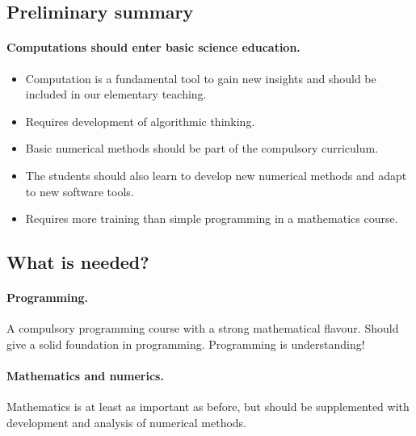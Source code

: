 \documentclass[%
twoside,                 %
final,                   %
10pt]{article}
\begin{document}
\noindent




\subsection{Preliminary summary}

\paragraph{Computations should enter basic science education.}

\begin{itemize}
\item Computation is a fundamental tool to gain new insights and should be included in our elementary teaching.

\item Requires development of algorithmic thinking.

\item Basic numerical methods should be part of the compulsory curriculum.

\item The students should also learn to develop new numerical methods and adapt to new software tools.

\item Requires more training than simple programming in a mathematics course.
\end{itemize}

\noindent




\subsection{What is needed?}

\paragraph{Programming.}
A compulsory programming course with a strong mathematical flavour. Should give a solid foundation in programming. Programming is understanding!




\paragraph{Mathematics and numerics.}
Mathematics is at least as important as before, but should be supplemented with development and analysis of numerical methods.
\end{document}
